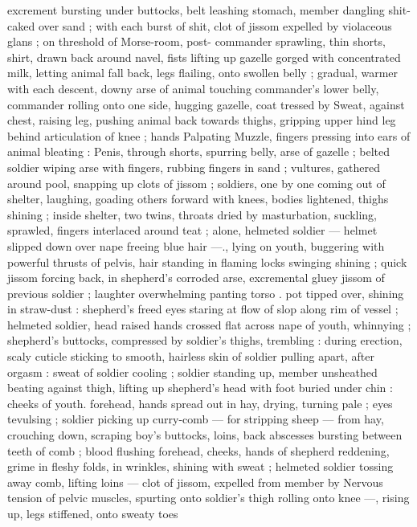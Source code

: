 {excrement bursting under buttocks, belt leashing stomach, member 
dangling shit-caked over sand ; with each burst of shit, clot of jissom 
expelled by violaceous glans ; on threshold of Morse-room, post- 
commander sprawling, thin shorts, shirt, drawn back around navel, 
fists lifting up gazelle gorged with concentrated milk, letting animal 
fall back, legs flailing, onto swollen belly ; gradual, warmer with each 
descent, downy arse of animal touching commander's lower belly, 
commander rolling onto one side, hugging gazelle, coat tressed by 
Sweat, against chest, raising leg, pushing animal back towards 
thighs, gripping upper hind leg behind articulation of knee ; hands 
Palpating Muzzle, fingers pressing into ears of animal bleating : 
Penis, through shorts, spurring belly, arse of gazelle ; belted soldier 
wiping arse with fingers, rubbing fingers in sand ; vultures, gathered 
around pool, snapping up clots of jissom ; soldiers, one by one 
coming out of shelter, laughing, goading others forward with knees, 
bodies lightened, thighs shining ; inside shelter, two twins, throats 
dried by masturbation, suckling, sprawled, fingers interlaced around 
teat ; alone, helmeted soldier --- helmet slipped down over nape 
freeing blue hair ---., lying on youth, buggering with powerful thrusts 
of pelvis, hair standing in flaming locks swinging shining ; quick 
jissom forcing back, in shepherd's corroded arse, excremental gluey 
jissom of previous soldier ; laughter overwhelming panting torso . 
pot tipped over, shining in straw-dust : shepherd's freed eyes staring 
at flow of slop along rim of vessel ; helmeted soldier, head raised 
hands crossed flat across nape of youth, whinnying ; shepherd's 
buttocks, compressed by soldier's thighs, trembling : during 
erection, scaly cuticle sticking to smooth, hairless skin of soldier 
pulling apart, after orgasm : sweat of soldier cooling ; soldier 
standing up, member unsheathed beating against thigh, lifting up 
shepherd's head with foot buried under chin : cheeks of youth. 
forehead, hands spread out in hay, drying, turning pale ; eyes 
tevulsing ; soldier picking up curry-comb --- for stripping sheep --- 
from hay, crouching down, scraping boy's buttocks, loins, back 
abscesses bursting between teeth of comb ; blood flushing 
forehead, cheeks, hands of shepherd reddening, grime in fleshy 
folds, in wrinkles, shining with sweat ; helmeted soldier tossing away 
comb, lifting loins --- clot of jissom, expelled from member by 
Nervous tension of pelvic muscles, spurting onto soldier's thigh 
rolling onto knee ---, rising up, legs stiffened, onto sweaty toes 
}

